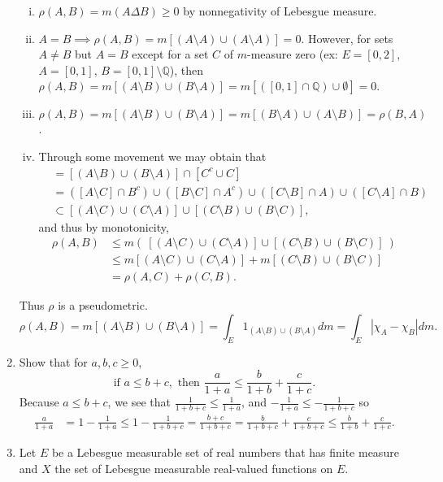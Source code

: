 \begin{enumerate}
    \begin{enumerate}[(i)]
        \item $\rho(A,B)=m(A\Delta B)\ge0$ by nonnegativity of Lebesgue measure.
        \item $A=B\implies \rho(A,B)=m[(A\setminus A)\cup(A\setminus A)]=0$.
        However, for sets $A\neq B$ but $A=B$ except for a set $C$ of $m$-measure zero (ex: $E=[0,2]$, $A=[0,1]$, $B=[0,1]\setminus\mathbb{Q}$), then $\rho(A,B)=m[(A\setminus B)\cup(B\setminus A)]=m[([0,1]\cap\mathbb{Q})\cup\emptyset]=0$.
        \item $\rho(A,B)=m[(A\setminus B)\cup(B\setminus A)]=m[(B\setminus A)\cup(A\setminus B)]=\rho(B,A)$.
        \item Through some movement we may obtain that 
        \begin{align*}
            [(A\setminus B)\cup(B\setminus A)]
            &=[(A\setminus B)\cup(B\setminus A)]\cap[C^c\cup C]\\
            &=([A\setminus C]\cap B^c)\cup([B\setminus C]\cap A^c)\cup([C\setminus B]\cap A)\cup([C\setminus A]\cap B)\\
            &\subset[(A\setminus C)\cup(C\setminus A)]\cup[(C\setminus B)\cup(B\setminus C)],
        \end{align*}
        and thus by monotonicity,
        \begin{align*}
            \rho(A,B)
            &\le m\left(\ [(A\setminus C)\cup(C\setminus A)]\cup[(C\setminus B)\cup(B\setminus C)]\ \right)\\
            &\le m[(A\setminus C)\cup(C\setminus A)]+m[(C\setminus B)\cup(B\setminus C)]\\
            &=\rho(A,C)+\rho(C,B).
            \end{align*}
    \end{enumerate}
    Thus $\rho$ is a pseudometric.
    \[
        \rho(A,B)=m[(A\setminus B)\cup(B\setminus A)]=\int_{E}1_{(A\setminus B)\cup(B\setminus A)}dm=\int_E|\chi_A-\chi_B|dm.
    \]
    \item Show that for $a,b,c\ge0$,
    \[
    \text{if }a\le b+c,\text{ then }\frac{a}{1+a}\le\frac{b}{1+b}+\frac{c}{1+c}.
    \]
    Because $a\le b+c$, we see that $\frac{1}{1+b+c}\le\frac{1}{1+a}$, and $-\frac{1}{1+a}\le-\frac{1}{1+b+c}$ so
    \begin{align*}
        \frac{a}{1+a}&=1-\frac{1}{1+a}\le1-\frac{1}{1+b+c}=\frac{b+c}{1+b+c}=\frac{b}{1+b+c}+\frac{c}{1+b+c}\le\frac{b}{1+b}+\frac{c}{1+c}.
    \end{align*}
    \item Let $E$ be a Lebesgue measurable set of real numbers that has finite measure and $X$ the set of Lebesgue measurable real-valued functions on $E$.

\end{enumerate}
